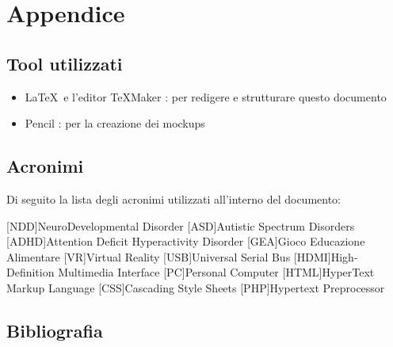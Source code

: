 \section{Appendice} \label{sec:app}

\subsection{Tool utilizzati} \label{subsec:tool}

\begin{itemize}
	\item \LaTeX\ e l'editor TeXMaker : per redigere e strutturare questo documento
	\item Pencil : per la creazione dei mockups
\end{itemize}

\subsection{Acronimi} \label{acr}
Di seguito la lista degli acronimi utilizzati all'interno del documento:

\begin{acronym}[NDD] %

[NDD]{NeuroDevelopmental Disorder}
[ASD]{Autistic Spectrum Disorders}
[ADHD]{Attention Deficit Hyperactivity Disorder}
[GEA]{Gioco Educazione Alimentare}
[VR]{Virtual Reality}
[USB]{Universal Serial Bus}
[HDMI]{High-Definition Multimedia Interface}
[PC]{Personal Computer}
[HTML]{HyperText Markup Language}
[CSS]{Cascading Style Sheets}
[PHP]{Hypertext Preprocessor}


\end{acronym}

\subsection{Bibliografia} \label{subsec:biblio}